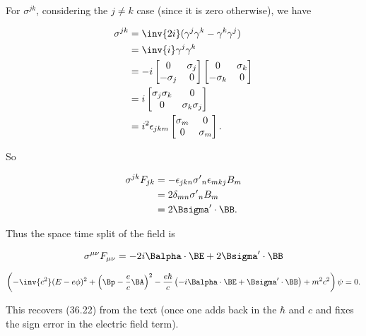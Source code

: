 For $\sigma^{j k}$, considering the $j \ne k$ case (since it is zero otherwise), we have

\begin{align*}
\sigma^{j k} 
&=
\inv{2i} (\gamma^j \gamma^k - \gamma^k \gamma^j) \\
&=
\inv{i} \gamma^j \gamma^k  \\
&=
- i 
\begin{bmatrix}
0 & \sigma_j \\
-\sigma_j & 0
\end{bmatrix}
\begin{bmatrix}
0 & \sigma_k \\
-\sigma_k & 0
\end{bmatrix}
\\
&=
i
\begin{bmatrix}
\sigma_j \sigma_k & 0 \\
0 & \sigma_k \sigma_j 
\end{bmatrix} \\
&=
i^2 \epsilon_{j k m}
\begin{bmatrix}
\sigma_m & 0 \\
0 & \sigma_m
\end{bmatrix}.
\end{align*} 

So

\begin{align*}
\sigma^{j k} F_{j k} 
&= 
- \epsilon_{j k n} {\sigma'}_n 
\epsilon_{m k j} B_m \\
&= 
2 \delta_{m n} {\sigma'}_n B_m \\
&= 
2 \Bsigma' \cdot \BB.
\end{align*}

Thus the space time split of the field is

\begin{equation}\label{eqn:diracCovariant:420}
\sigma^{\mu \nu} F_{\mu \nu}
=
-2 i \Balpha \cdot \BE + 2 \Bsigma' \cdot \BB
\end{equation}

\begin{equation}\label{eqn:diracCovariant:440}
\left( 
-\inv{c^2 } (E - e \phi)^2 + \left(\Bp - \frac{e }{c} \BA \right)^2
- \frac{ e \hbar }{ c } \left( -i \Balpha \cdot \BE + \Bsigma' \cdot \BB \right) + m^2 c^2 \right) \psi  = 0.
\end{equation}

This recovers (36.22) from the text (once one adds back in the $\hbar$ and $c$ and fixes the sign error in the electric field term).

\EndArticle

